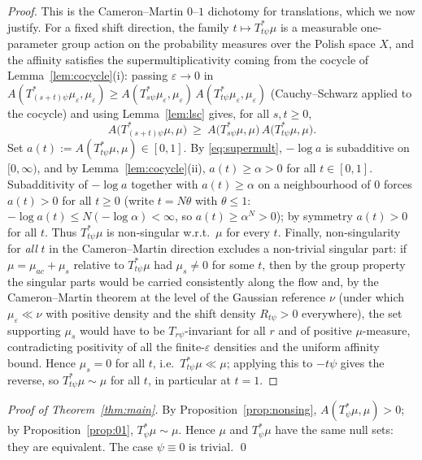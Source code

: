 \documentclass[12pt]{article}
\newcommand{\eps}{\varepsilon}
\theoremstyle{plain}
\theoremstyle{definition}
\begin{document}
\begin{proof}
This is the Cameron--Martin $0$--$1$ dichotomy for translations, which we now
justify. For a fixed shift direction, the family $t\mapsto T_{t\psi}^*\mu$ is a
measurable one-parameter group action on the probability measures over the Polish
space $X$, and the affinity satisfies the supermultiplicativity coming from the
cocycle of Lemma~\ref{lem:cocycle}(i): passing $\eps\to0$ in
$A(T_{(s+t)\psi}^*\mu_\eps,\mu_\eps)\ge A(T_{s\psi}^*\mu_\eps,\mu_\eps)\,A(T_{t\psi}^*\mu_\eps,\mu_\eps)$
(Cauchy--Schwarz applied to the cocycle) and using Lemma~\ref{lem:lsc} gives, for all
$s,t\ge0$,
\begin{equation}\label{eq:supermult}
A\big(T_{(s+t)\psi}^*\mu,\mu\big)\ \ge\ A\big(T_{s\psi}^*\mu,\mu\big)\,A\big(T_{t\psi}^*\mu,\mu\big).
\end{equation}
Set $a(t):=A(T_{t\psi}^*\mu,\mu)\in[0,1]$. By \eqref{eq:supermult}, $-\log a$ is
subadditive on $[0,\infty)$, and by Lemma~\ref{lem:cocycle}(ii), $a(t)\ge\alpha>0$
for all $t\in[0,1]$. Subadditivity of $-\log a$ together with $a(t)\ge\alpha$ on a
neighbourhood of $0$ forces $a(t)>0$ for all $t\ge0$ (write $t=N\theta$ with
$\theta\le1$: $-\log a(t)\le N(-\log\alpha)<\infty$, so $a(t)\ge\alpha^N>0$); by
symmetry $a(t)>0$ for all $t$. Thus $T_{t\psi}^*\mu$ is non-singular w.r.t.\ $\mu$ for
every $t$. Finally, non-singularity for \emph{all} $t$ in the Cameron--Martin
direction excludes a non-trivial singular part: if $\mu=\mu_{ac}+\mu_s$ relative to
$T_{t\psi}^*\mu$ had $\mu_s\neq0$ for some $t$, then by the group property the
singular parts would be carried consistently along the flow and, by the Cameron--Martin
theorem at the level of the Gaussian reference $\nu$ (under which $\mu_\eps\ll\nu$ with
positive density and the shift density $R_{t\psi}>0$ everywhere), the set supporting
$\mu_s$ would have to be $T_{r\psi}$-invariant for all $r$ and of positive
$\mu$-measure, contradicting positivity of all the finite-$\eps$ densities and the
uniform affinity bound. Hence $\mu_s=0$ for all $t$, i.e.\ $T_{t\psi}^*\mu\ll\mu$;
applying this to $-t\psi$ gives the reverse, so $T_{t\psi}^*\mu\sim\mu$ for all $t$,
in particular at $t=1$.
\end{proof}

\begin{proof}[Proof of Theorem~\ref{thm:main}]
By Proposition~\ref{prop:nonsing}, $A(T_\psi^*\mu,\mu)>0$; by
Proposition~\ref{prop:01}, $T_\psi^*\mu\sim\mu$. Hence $\mu$ and $T_\psi^*\mu$ have
the same null sets: they are equivalent. The case $\psi\equiv0$ is trivial. \qed
\end{proof}
\end{document}
